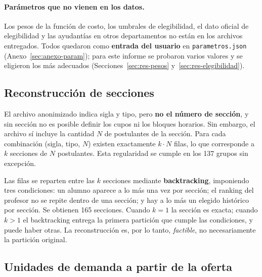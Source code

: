 \documentclass{article}
\begin{document}
\begin{table}[H]
\centering
\small

\hspace{1cm}

\caption{Datos utilizados: resumen general (izquierda) y postulaciones por tipo de ayudante (derecha).}
\label{tab:datos}
\end{table}

\paragraph{Parámetros que no vienen en los datos.} Los pesos de la función de costo, los umbrales de elegibilidad, el dato oficial de elegibilidad y las ayudantías en otros departamentos no están en los archivos entregados. Todos quedaron como \textbf{entrada del usuario} en \texttt{parametros.json} (Anexo~\ref{sec:anexo-param}); para este informe se probaron varios valores y se eligieron los más adecuados (Secciones~\ref{sec:res-pesos} y~\ref{sec:res-elegibilidad}).

\subsection{Reconstrucción de secciones}
\label{sec:reconstruccion}

El archivo anonimizado indica sigla y tipo, pero \textbf{no el número de sección}, y sin sección no es posible definir los cupos ni los bloques horarios. Sin embargo, el archivo sí incluye la cantidad $N$ de postulantes de la sección. Para cada combinación (sigla, tipo, $N$) existen exactamente $k \cdot N$ filas, lo que corresponde a $k$ secciones de $N$ postulantes. Esta regularidad se cumple en los 137 grupos sin excepción.

Las filas se reparten entre las $k$ secciones mediante \textbf{backtracking}, imponiendo tres condiciones: un alumno aparece a lo más una vez por sección; el ranking del profesor no se repite dentro de una sección; y hay a lo más un elegido histórico por sección. Se obtienen 165 secciones. Cuando $k = 1$ la sección es exacta; cuando $k > 1$ el backtracking entrega la primera partición que cumple las condiciones, y puede haber otras. La reconstrucción es, por lo tanto, \emph{factible}, no necesariamente la partición original.

\subsection{Unidades de demanda a partir de la oferta}
\label{sec:unidades}
\end{document}
